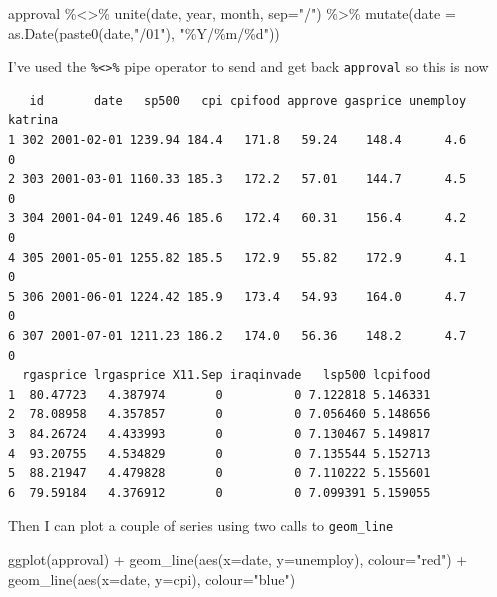 \documentclass[
  letterpaper,
]{book}
\newenvironment{Shaded}{\begin{snugshade}}{\end{snugshade}}
\newcommand{\AttributeTok}[1]{\textcolor[rgb]{0.40,0.45,0.13}{#1}}
\newcommand{\FunctionTok}[1]{\textcolor[rgb]{0.28,0.35,0.67}{#1}}
\newcommand{\NormalTok}[1]{\textcolor[rgb]{0.00,0.23,0.31}{#1}}
\newcommand{\SpecialCharTok}[1]{\textcolor[rgb]{0.37,0.37,0.37}{#1}}
\newcommand{\StringTok}[1]{\textcolor[rgb]{0.13,0.47,0.30}{#1}}
\begin{document}
\begin{Shaded}
\begin{Highlighting}[]
\NormalTok{approval }\SpecialCharTok{\%\textless{}\textgreater{}\%} 
  \FunctionTok{unite}\NormalTok{(date, year, month, }\AttributeTok{sep=}\StringTok{"/"}\NormalTok{) }\SpecialCharTok{\%\textgreater{}\%} 
  \FunctionTok{mutate}\NormalTok{(}\AttributeTok{date =} \FunctionTok{as.Date}\NormalTok{(}\FunctionTok{paste0}\NormalTok{(date,}\StringTok{"/01"}\NormalTok{), }\StringTok{"\%Y/\%m/\%d"}\NormalTok{))}
\end{Highlighting}
\end{Shaded}

I've used the \texttt{\%\textless{}\textgreater{}\%} pipe operator to
send and get back \texttt{approval} so this is now

\begin{verbatim}
   id       date   sp500   cpi cpifood approve gasprice unemploy katrina
1 302 2001-02-01 1239.94 184.4   171.8   59.24    148.4      4.6       0
2 303 2001-03-01 1160.33 185.3   172.2   57.01    144.7      4.5       0
3 304 2001-04-01 1249.46 185.6   172.4   60.31    156.4      4.2       0
4 305 2001-05-01 1255.82 185.5   172.9   55.82    172.9      4.1       0
5 306 2001-06-01 1224.42 185.9   173.4   54.93    164.0      4.7       0
6 307 2001-07-01 1211.23 186.2   174.0   56.36    148.2      4.7       0
  rgasprice lrgasprice X11.Sep iraqinvade   lsp500 lcpifood
1  80.47723   4.387974       0          0 7.122818 5.146331
2  78.08958   4.357857       0          0 7.056460 5.148656
3  84.26724   4.433993       0          0 7.130467 5.149817
4  93.20755   4.534829       0          0 7.135544 5.152713
5  88.21947   4.479828       0          0 7.110222 5.155601
6  79.59184   4.376912       0          0 7.099391 5.159055
\end{verbatim}

Then I can plot a couple of series using two calls to
\texttt{geom\_line}

\begin{Shaded}
\begin{Highlighting}[]
\FunctionTok{ggplot}\NormalTok{(approval) }\SpecialCharTok{+}
  \FunctionTok{geom\_line}\NormalTok{(}\FunctionTok{aes}\NormalTok{(}\AttributeTok{x=}\NormalTok{date, }\AttributeTok{y=}\NormalTok{unemploy), }\AttributeTok{colour=}\StringTok{"red"}\NormalTok{) }\SpecialCharTok{+}
  \FunctionTok{geom\_line}\NormalTok{(}\FunctionTok{aes}\NormalTok{(}\AttributeTok{x=}\NormalTok{date, }\AttributeTok{y=}\NormalTok{cpi), }\AttributeTok{colour=}\StringTok{"blue"}\NormalTok{) }
\end{Highlighting}
\end{Shaded}
\end{document}
